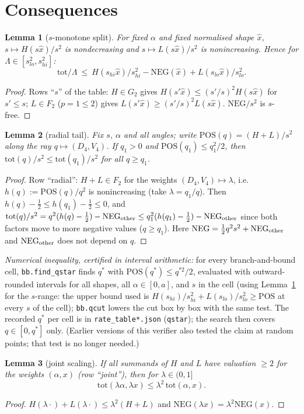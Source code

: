\documentclass[11pt]{article}
\newtheorem{lemma}{Lemma}
\theoremstyle{definition}
\newcommand{\Ly}{\Lambda}
\newcommand{\tot}{\mathrm{tot}}
\begin{document}
\section{Consequences}
\begin{lemma}[$s$-monotone split]\label{lem:s} For fixed $\alpha$ and fixed normalised shape $\hat x$, $s\mapsto H(s\hat x)/s^2$ is nondecreasing and $s\mapsto L(s\hat x)/s^2$ is nonincreasing. Hence for $\Ly\in[s_{lo}^2,s_{hi}^2]$:
\[\tot/\Ly\ \le\ H(s_{hi}\hat x)/s_{hi}^2-\mathrm{NEG}(\hat x)+L(s_{lo}\hat x)/s_{lo}^2 .\]
\end{lemma}
\begin{proof} Rows ``$s$'' of the table: $H\in G_2$ gives $H(s'\hat x)\le (s'/s)^2H(s\hat x)$ for $s'\le s$; $L\in F_2$ ($p=1\le2$) gives $L(s'\hat x)\ge(s'/s)^{2}L(s\hat x)$. $\mathrm{NEG}/s^2$ is $s$-free.
\end{proof}
\begin{lemma}[radial tail]\label{lem:radial} Fix $s$, $\alpha$ and all angles; write $\mathrm{POS}(q)=(H+L)/s^2$ along the ray $q\mapsto(D_4,V_4)$. If $q_1>0$ and $\mathrm{POS}(q_1)\le q_1^2/2$, then $\tot(q)/s^2\le\tot(q_1)/s^2$ for all $q\ge q_1$.
\end{lemma}
\begin{proof} Row ``radial'': $H+L\in F_2$ for the weights $(D_4,V_4)\mapsto\lambda$, i.e.\ $h(q):=\mathrm{POS}(q)/q^2$ is nonincreasing (take $\lambda=q_1/q$). Then $h(q)-\tfrac12\le h(q_1)-\tfrac12\le0$, and
$\tot(q)/s^2=q^2(h(q)-\tfrac12)-\mathrm{NEG}_{\rm other}\le q_1^2(h(q_1)-\tfrac12)-\mathrm{NEG}_{\rm other}$ since both factors move to more negative values ($q\ge q_1$). Here $\mathrm{NEG}=\frac12 q^2s^2+\mathrm{NEG}_{\rm other}$ and $\mathrm{NEG}_{\rm other}$ does not depend on $q$.
\end{proof}
\emph{Numerical inequality, certified in interval arithmetic:} for every branch-and-bound cell, \texttt{bb.find\_qstar} finds $q^*$ with $\mathrm{POS}(q^*)\le q^{*2}/2$, evaluated with outward-rounded intervals for all shapes, all $\alpha\in[0,a]$, and $s$ in the cell (using Lemma~\ref{lem:s} for the $s$-range: the upper bound used is $H(s_{hi})/s_{hi}^2+L(s_{lo})/s_{lo}^2\ge\mathrm{POS}$ at every $s$ of the cell); \texttt{bb.qcut} lowers the cut box by box with the same test. The recorded $q^*$ per cell is in \texttt{rate\_table*.json} (\texttt{qstar}); the search then covers $q\in[0,q^*]$ only. (Earlier versions of this verifier also tested the claim at random points; that test is no longer needed.)

\begin{lemma}[joint scaling]\label{lem:joint} If all summands of $H$ and $L$ have valuation $\ge2$ for the weights $(\alpha,x)$ (row ``joint''), then for $\lambda\in(0,1]$
\[\tot(\lambda\alpha,\lambda x)\le\lambda^2\,\tot(\alpha,x).\]
\end{lemma}
\begin{proof} $H(\lambda\cdot)+L(\lambda\cdot)\le\lambda^2(H+L)$ and $\mathrm{NEG}(\lambda x)=\lambda^2\mathrm{NEG}(x)$.\end{proof}
\end{document}
